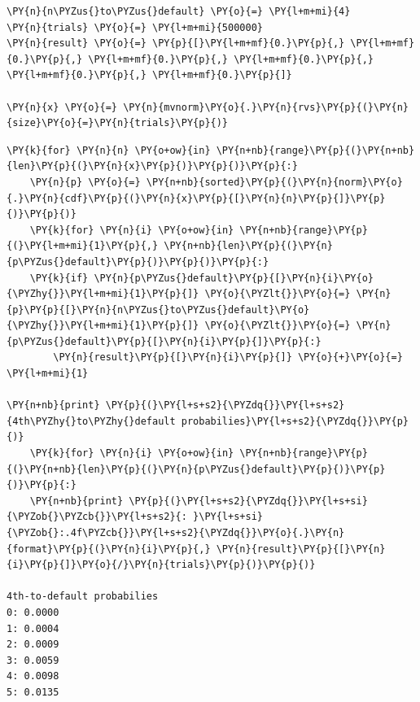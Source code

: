\begin{Answer}
\begin{tcolorbox}[breakable, size=fbox, boxrule=1pt, pad at break*=1mm,colback=cellbackground, colframe=cellborder]
\begin{Verbatim}[commandchars=\\\{\}]
\PY{n}{n\PYZus{}to\PYZus{}default} \PY{o}{=} \PY{l+m+mi}{4}
\PY{n}{trials} \PY{o}{=} \PY{l+m+mi}{500000}
\PY{n}{result} \PY{o}{=} \PY{p}{[}\PY{l+m+mf}{0.}\PY{p}{,} \PY{l+m+mf}{0.}\PY{p}{,} \PY{l+m+mf}{0.}\PY{p}{,} \PY{l+m+mf}{0.}\PY{p}{,} \PY{l+m+mf}{0.}\PY{p}{,} \PY{l+m+mf}{0.}\PY{p}{]}

\PY{n}{x} \PY{o}{=} \PY{n}{mvnorm}\PY{o}{.}\PY{n}{rvs}\PY{p}{(}\PY{n}{size}\PY{o}{=}\PY{n}{trials}\PY{p}{)}
\end{Verbatim}
\end{tcolorbox}
\begin{tcolorbox}[breakable, size=fbox, boxrule=1pt, pad at break*=1mm,colback=cellbackground, colframe=cellborder]
\begin{Verbatim}[commandchars=\\\{\}]
\PY{k}{for} \PY{n}{n} \PY{o+ow}{in} \PY{n+nb}{range}\PY{p}{(}\PY{n+nb}{len}\PY{p}{(}\PY{n}{x}\PY{p}{)}\PY{p}{)}\PY{p}{:}
    \PY{n}{p} \PY{o}{=} \PY{n+nb}{sorted}\PY{p}{(}\PY{n}{norm}\PY{o}{.}\PY{n}{cdf}\PY{p}{(}\PY{n}{x}\PY{p}{[}\PY{n}{n}\PY{p}{]}\PY{p}{)}\PY{p}{)}
    \PY{k}{for} \PY{n}{i} \PY{o+ow}{in} \PY{n+nb}{range}\PY{p}{(}\PY{l+m+mi}{1}\PY{p}{,} \PY{n+nb}{len}\PY{p}{(}\PY{n}{p\PYZus{}default}\PY{p}{)}\PY{p}{)}\PY{p}{:}
    \PY{k}{if} \PY{n}{p\PYZus{}default}\PY{p}{[}\PY{n}{i}\PY{o}{\PYZhy{}}\PY{l+m+mi}{1}\PY{p}{]} \PY{o}{\PYZlt{}}\PY{o}{=} \PY{n}{p}\PY{p}{[}\PY{n}{n\PYZus{}to\PYZus{}default}\PY{o}{\PYZhy{}}\PY{l+m+mi}{1}\PY{p}{]} \PY{o}{\PYZlt{}}\PY{o}{=} \PY{n}{p\PYZus{}default}\PY{p}{[}\PY{n}{i}\PY{p}{]}\PY{p}{:}
        \PY{n}{result}\PY{p}{[}\PY{n}{i}\PY{p}{]} \PY{o}{+}\PY{o}{=} \PY{l+m+mi}{1}
	
\PY{n+nb}{print} \PY{p}{(}\PY{l+s+s2}{\PYZdq{}}\PY{l+s+s2}{4th\PYZhy{}to\PYZhy{}default probabilies}\PY{l+s+s2}{\PYZdq{}}\PY{p}{)}
	\PY{k}{for} \PY{n}{i} \PY{o+ow}{in} \PY{n+nb}{range}\PY{p}{(}\PY{n+nb}{len}\PY{p}{(}\PY{n}{p\PYZus{}default}\PY{p}{)}\PY{p}{)}\PY{p}{:}
	\PY{n+nb}{print} \PY{p}{(}\PY{l+s+s2}{\PYZdq{}}\PY{l+s+si}{\PYZob{}\PYZcb{}}\PY{l+s+s2}{: }\PY{l+s+si}{\PYZob{}:.4f\PYZcb{}}\PY{l+s+s2}{\PYZdq{}}\PY{o}{.}\PY{n}{format}\PY{p}{(}\PY{n}{i}\PY{p}{,} \PY{n}{result}\PY{p}{[}\PY{n}{i}\PY{p}{]}\PY{o}{/}\PY{n}{trials}\PY{p}{)}\PY{p}{)}

4th-to-default probabilies
0: 0.0000
1: 0.0004
2: 0.0009
3: 0.0059
4: 0.0098
5: 0.0135
\end{Verbatim}
\end{tcolorbox}
\end{Answer}


